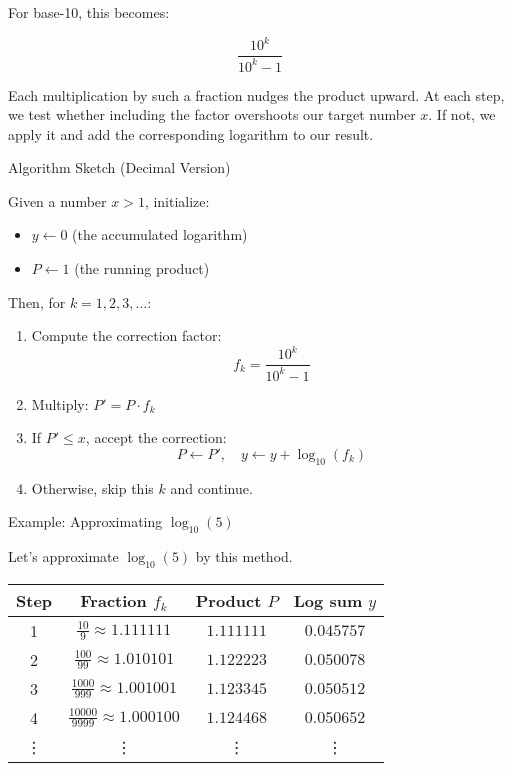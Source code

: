 \documentclass[10pt,twocolumn]{article}
\begin{document}
For base-10, this becomes:

\[
\frac{10^k}{10^k - 1}
\]

Each multiplication by such a fraction nudges the product upward. At each step, we test whether including the factor overshoots our target number \( x \). If not, we apply it and add the corresponding logarithm to our result.

Algorithm Sketch (Decimal Version)

Given a number \( x > 1 \), initialize:

\begin{itemize}
    \item \( y \leftarrow 0 \) (the accumulated logarithm)
    \item \( P \leftarrow 1 \) (the running product)
\end{itemize}

Then, for \( k = 1, 2, 3, \ldots \):

\begin{enumerate}
    \item Compute the correction factor:
    \[
    f_k = \frac{10^k}{10^k - 1}
    \]
    \item Multiply: \( P' = P \cdot f_k \)
    \item If \( P' \le x \), accept the correction:
    \[
    P \leftarrow P', \quad y \leftarrow y + \log_{10}(f_k)
    \]
    \item Otherwise, skip this \( k \) and continue.
\end{enumerate}

Example: Approximating \( \log_{10}(5) \)

Let’s approximate \( \log_{10}(5) \) by this method.

\begin{center}
\begin{tabular}{|c|c|c|c|}
\hline
Step & Fraction \( f_k \) & Product \( P \) & Log sum \( y \) \\
\hline
1 & \( \frac{10}{9} \approx 1.111111 \) & \( 1.111111 \) & \( 0.045757 \) \\
2 & \( \frac{100}{99} \approx 1.010101 \) & \( 1.122223 \) & \( 0.050078 \) \\
3 & \( \frac{1000}{999} \approx 1.001001 \) & \( 1.123345 \) & \( 0.050512 \) \\
4 & \( \frac{10000}{9999} \approx 1.000100 \) & \( 1.124468 \) & \( 0.050652 \) \\
\vdots & \vdots & \vdots & \vdots \\
\hline
\end{tabular}
\end{center}
\end{document}
